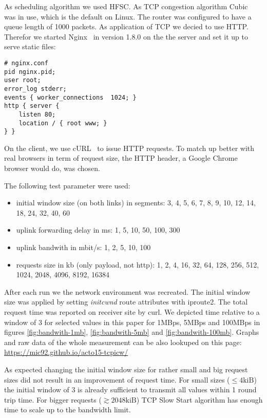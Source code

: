 As scheduling algorithm we used HFSC. As TCP congestion algorithm
Cubic~\cite{cubic} was in use, which is the default on Linux. The router was
configured to have a queue length of 1000 packets. As application of TCP we
decied to use HTTP. Therefor we started Nginx~\cite{nginx} in version 1.8.0 on
the the server and set it up to serve static files:

\begin{lstlisting}
# nginx.conf
pid nginx.pid;
user root;
error_log stderr;
events { worker_connections  1024; }
http { server {
    listen 80;
    location / { root www; }
} }
\end{lstlisting}

On the client, we use cURL~\cite{curl} to issue HTTP requests. To match up
better with real browsers in term of request size, the HTTP header, a Google
Chrome browser would do, was chosen.

The following test parameter were used:

\begin{itemize}
  \item initial window size (on both links) in segments: 3, 4, 5, 6, 7, 8, 9, 10, 12, 14, 18, 24, 32, 40, 60
  \item uplink forwarding delay in ms: 1, 5, 10, 50, 100, 300
  \item uplink bandwith in mbit/s: 1, 2, 5, 10, 100
  \item requests size in kb (only payload, not http): 1, 2, 4, 16, 32, 64, 128, 256, 512, 1024, 2048, 4096, 8192, 16384
\end{itemize}

After each run we the network environment was recreated. The initial window size
was applied by setting \emph{initcwnd} route attributes with iproute2. The total
request time was reported on receiver site by curl. We depicted time relative to
a window of 3 for selected values in this paper for 1MBps, 5MBps and 100MBps in
figures \ref{fig:bandwith-1mb}, \ref{fig:bandwith-5mb} and
\ref{fig:bandwith-100mb}. Graphs and raw data of the whole measurement can
be also lookuped on this page: \url{https://mic92.github.io/acto15-tcpicw/}

As expected changing the initial window size for rather small and big request
sizes did not result in an improvement of request time. For small sizes
($\leq{}4\text{kiB}$) the initial window of 3 is already sufficient to transmit
all values within 1 round trip time. For bigger requests
($\gtrsim{}2048\text{kiB}$) TCP Slow Start algorithm has enough time to scale
up to the bandwidth limit.



%
%
